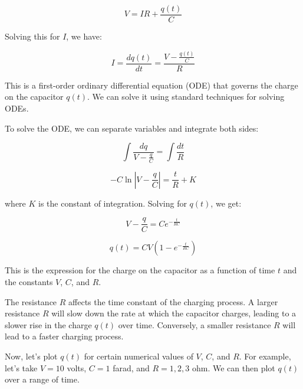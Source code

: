 \[ V = IR + \frac{q(t)}{C} \]

Solving this for \( I \), we have:

\[ I = \frac{dq(t)}{dt} = \frac{V - \frac{q(t)}{C}}{R} \]

This is a first-order ordinary differential equation (ODE) that governs the charge on the capacitor \( q(t) \). We can solve it using standard techniques for solving ODEs.

To solve the ODE, we can separate variables and integrate both sides:

\[ \int \frac{dq}{V - \frac{q}{C}} = \int \frac{dt}{R} \]

\[ -C\ln\left|V - \frac{q}{C}\right| = \frac{t}{R} + K \]

where \( K \) is the constant of integration. Solving for \( q(t) \), we get:

\[ V - \frac{q}{C} = Ce^{-\frac{t}{RC}} \]

\[ q(t) = CV(1 - e^{-\frac{t}{RC}}) \]

This is the expression for the charge on the capacitor as a function of time \( t \) and the constants \( V \), \( C \), and \( R \). 

The resistance \( R \) affects the time constant of the charging process. A larger resistance \( R \) will slow down the rate at which the capacitor charges, leading to a slower rise in the charge \( q(t) \) over time. Conversely, a smaller resistance \( R \) will lead to a faster charging process. 

\newpage
\thispagestyle{plain}

Now, let's plot \( q(t) \) for certain numerical values of \( V \), \( C \), and \( R \). For example, let's take \( V = 10 \) volts, \( C = 1 \) farad, and \( R = 1,2,3 \) ohm. We can then plot \( q(t) \) over a range of time.


